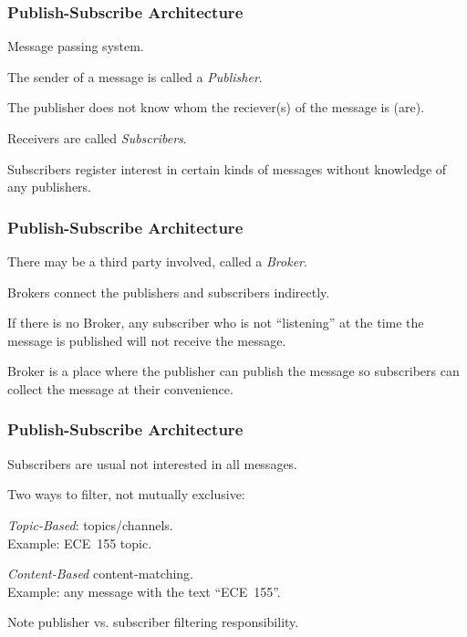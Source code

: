 \begin{frame}
\frametitle{Publish-Subscribe Architecture}

\begin{changemargin}{1cm}
Message passing system.

The sender of a message is called a \textit{Publisher}. 

The publisher does not know whom the reciever(s) of the message is (are). 

Receivers are called \textit{Subscribers}. 

Subscribers register interest in certain kinds of messages without knowledge of any publishers.

\end{changemargin}
\end{frame}

\begin{frame}
\frametitle{Publish-Subscribe Architecture}

\begin{changemargin}{1cm}

There may be a third party involved, called a \textit{Broker}.

Brokers connect the publishers and subscribers indirectly. 

If there is no Broker, any subscriber who is not ``listening'' at the time the message is published will not receive the message. 

Broker is a place where the publisher can publish the message so subscribers can collect the message at their convenience.


\end{changemargin}
\end{frame}

\begin{frame}
\frametitle{Publish-Subscribe Architecture}

\begin{changemargin}{1cm}

Subscribers are usual not interested in all messages.

Two ways to filter, not mutually exclusive:

\textit{Topic-Based}: topics/channels. \\
\quad Example: ECE~155 topic. 

\textit{Content-Based} content-matching. \\
\quad Example: any message with the text ``ECE~155''.

Note publisher vs. subscriber filtering responsibility.

\end{changemargin}
\end{frame}

